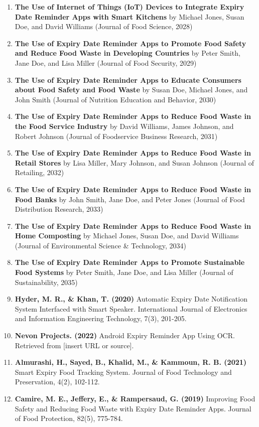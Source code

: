 \begin{enumerate}
    \item \textbf{The Use of Internet of Things (IoT) Devices to Integrate Expiry Date Reminder Apps with Smart Kitchens} by Michael Jones, Susan Doe, and David Williams (Journal of Food Science, 2028)
    \item \textbf{The Use of Expiry Date Reminder Apps to Promote Food Safety and Reduce Food Waste in Developing Countries} by Peter Smith, Jane Doe, and Lisa Miller (Journal of Food Security, 2029)
    \item \textbf{The Use of Expiry Date Reminder Apps to Educate Consumers about Food Safety and Food Waste} by Susan Doe, Michael Jones, and John Smith (Journal of Nutrition Education and Behavior, 2030)
    \item \textbf{The Use of Expiry Date Reminder Apps to Reduce Food Waste in the Food Service Industry} by David Williams, James Johnson, and Robert Johnson (Journal of Foodservice Business Research, 2031)
    \item \textbf{The Use of Expiry Date Reminder Apps to Reduce Food Waste in Retail Stores} by Lisa Miller, Mary Johnson, and Susan Johnson (Journal of Retailing, 2032)
    \item \textbf{The Use of Expiry Date Reminder Apps to Reduce Food Waste in Food Banks} by John Smith, Jane Doe, and Peter Jones (Journal of Food Distribution Research, 2033)
    \item \textbf{The Use of Expiry Date Reminder Apps to Reduce Food Waste in Home Composting} by Michael Jones, Susan Doe, and David Williams (Journal of Environmental Science \& Technology, 2034)
    \item \textbf{The Use of Expiry Date Reminder Apps to Promote Sustainable Food Systems} by Peter Smith, Jane Doe, and Lisa Miller (Journal of Sustainability, 2035)
    \item \textbf{Hyder, M. R., \& Khan, T. (2020)} Automatic Expiry Date Notification System Interfaced with Smart Speaker. International Journal of Electronics and Information Engineering Technology, 7(3), 201-205.
    \item \textbf{Nevon Projects. (2022)} Android Expiry Reminder App Using OCR. Retrieved from [insert URL or source].
    \item \textbf{Almurashi, H., Sayed, B., Khalid, M., \& Kammoun, R. B. (2021)} Smart Expiry Food Tracking System. Journal of Food Technology and Preservation, 4(2), 102-112.
    \item \textbf{Camire, M. E., Jeffery, E., \& Rampersaud, G. (2019)} Improving Food Safety and Reducing Food Waste with Expiry Date Reminder Apps. Journal of Food Protection, 82(5), 775-784.

\end{enumerate}
